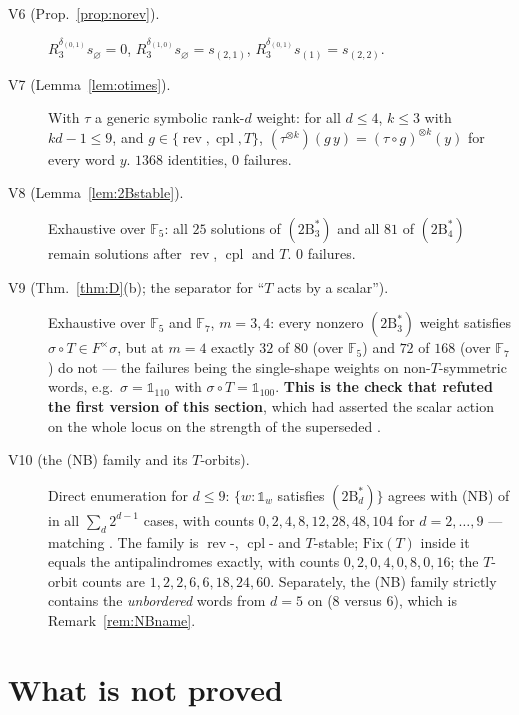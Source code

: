 \documentclass[11pt]{article}
\theoremstyle{definition}
\theoremstyle{remark}
\newcommand{\rev}{\operatorname{rev}}
\newcommand{\cpl}{\operatorname{cpl}}
\begin{document}
\begin{description}
\item[V6 (Prop.~\ref{prop:norev}).]  $R_3^{\delta_{(0,1)}}s_\varnothing=0$,
  $R_3^{\delta_{(1,0)}}s_\varnothing=s_{(2,1)}$, $R_3^{\delta_{(0,1)}}s_{(1)}=s_{(2,2)}$.

\item[V7 (Lemma~\ref{lem:otimes}).]  With $\tau$ a generic symbolic rank-$d$ weight: for all
  $d\le4$, $k\le3$ with $kd-1\le9$, and $g\in\{\rev,\cpl,T\}$,
  $(\tau^{\otimes k})(g\,y)=(\tau\circ g)^{\otimes k}(y)$ for every word $y$.  $1368$
  identities, $0$ failures.

\item[V8 (Lemma~\ref{lem:2Bstable}).]  Exhaustive over $\mathbb F_5$: all $25$ solutions of
  $(2\mathrm B^{*}_3)$ and all $81$ of $(2\mathrm B^{*}_4)$ remain solutions after $\rev$,
  $\cpl$ and $T$.  $0$ failures.

\item[V9 (Thm.~\ref{thm:D}(b); the separator for ``$T$ acts by a scalar'').]  Exhaustive over
  $\mathbb F_5$ and $\mathbb F_7$, $m=3,4$: every nonzero $(2\mathrm B^{*}_3)$ weight satisfies
  $\sigma\circ T\in F^{\times}\sigma$, but at $m=4$ exactly $32$ of $80$ (over $\mathbb F_5$)
  and $72$ of $168$ (over $\mathbb F_7$) do not --- the failures being the single-shape weights
  on non-$T$-symmetric words, e.g.\ $\sigma=\mathbb 1_{110}$ with
  $\sigma\circ T=\mathbb 1_{100}$.  \textbf{This is the check that refuted the first version of
  this section}, which had asserted the scalar action on the whole locus on the strength of
  the superseded \cite[Thm.~\texttt{thm:main}]{Q149}.

\item[V10 (the (NB) family and its $T$-orbits).]  Direct enumeration for $d\le9$:
  $\{w:\mathbb 1_w$ satisfies $(2\mathrm B^{*}_d)\}$ agrees with (NB) of
  \cite[Def.~\texttt{def:border}]{Q150c2} in all $\sum_d 2^{d-1}$ cases, with counts
  $0,2,4,8,12,28,48,104$ for $d=2,\dots,9$ --- matching \cite[\S ver]{Q150c2}.  The family is
  $\rev$-, $\cpl$- and $T$-stable; $\mathrm{Fix}(T)$ inside it equals the antipalindromes
  exactly, with counts $0,2,0,4,0,8,0,16$; the $T$-orbit counts are $1,2,2,6,6,18,24,60$.
  Separately, the (NB) family strictly contains the \emph{unbordered} words from $d=5$ on
  ($8$ versus $6$), which is Remark~\ref{rem:NBname}.
\end{description}

\section{What is not proved}
\end{document}
